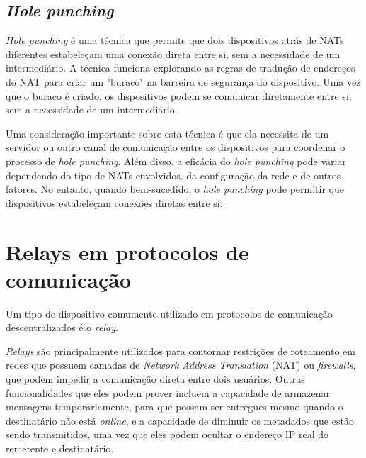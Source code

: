 \subsection{\textit{Hole punching}}

\textit{Hole punching} é uma técnica que permite que dois dispositivos atrás de NATs diferentes estabeleçam uma conexão direta entre si, sem a necessidade de um intermediário. A técnica funciona explorando as regras de tradução de endereços do NAT para criar um "buraco" na barreira de segurança do dispositivo. Uma vez que o buraco é criado, os dispositivos podem se comunicar diretamente entre si, sem a necessidade de um intermediário.

Uma consideração importante sobre esta técnica é que ela necessita de um servidor ou outro canal de comunicação entre os dispositivos para coordenar o processo de \textit{hole punching}. Além disso, a eficácia do \textit{hole punching} pode variar dependendo do tipo de NATs envolvidos, da configuração da rede e de outros fatores. No entanto, quando bem-sucedido, o \textit{hole punching} pode permitir que dispositivos estabeleçam conexões diretas entre si.

\section {Relays em protocolos de comunicação}

Um tipo de dispositivo comumente utilizado em protocolos de comunicação descentralizados é o \textit{relay}.


\textit{Relays} são principalmente utilizados para contornar restrições de roteamento em redes que possuem camadas de \textit{Network Address Translation} (NAT) ou \textit{firewalls}, que podem impedir a comunicação direta entre dois usuários. Outras funcionalidades que eles podem prover incluem a capacidade de armazenar mensagens temporariamente, para que possam ser entregues mesmo quando o destinatário não está \textit{online}, e a capacidade de diminuir os metadados que estão sendo transmitidos, uma vez que eles podem ocultar o endereço IP real do remetente e destinatário.

